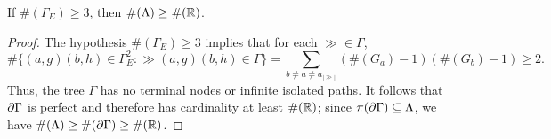 \begin{corollary}
\label{corollaryuncountable}
If $\#(\Gamma_E) \geq 3$, then $\#(\Lambda)\geq \#(\R)$.
\end{corollary}
\begin{proof}
The hypothesis $\#(\Gamma_E)\geq 3$ implies that for each $\gg\in\Gamma$,
\[
\#\{(a,g)(b,h)\in\Gamma_E^2 : \gg(a,g)(b,h)\in \Gamma\} = \sum_{b\neq a\neq a_{|\gg|}} (\#(G_a) - 1)(\#(G_b) - 1) \geq 2.
\]
Thus, the tree $\Gamma$ has no terminal nodes or infinite isolated paths. It follows that $\partial\Gamma$ is perfect and therefore has cardinality at least $\#(\R)$; since $\pi(\partial\Gamma)\subseteq\Lambda$, we have $\#(\Lambda) \geq \#(\del\Gamma)\geq \#(\R)$.
\end{proof}










